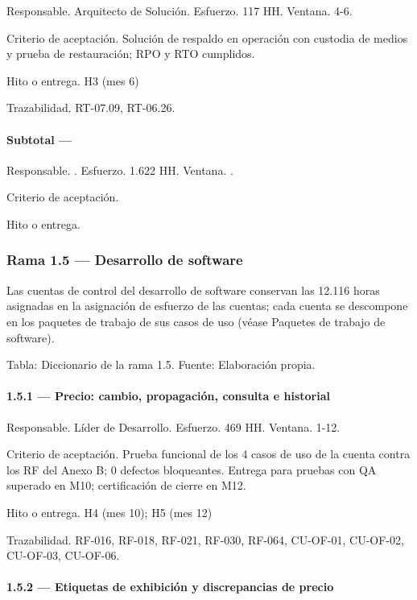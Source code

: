 \documentclass[11pt]{article}
\begin{document}
Responsable. Arquitecto de Solución. Esfuerzo. 117 HH. Ventana. 4-6.

Criterio de aceptación. Solución de respaldo en operación con custodia de medios y prueba de restauración; RPO y RTO cumplidos.

Hito o entrega. H3 (mes 6)

Trazabilidad. RT-07.09, RT-06.26.

\paragraph{Subtotal — }

Responsable. . Esfuerzo. 1.622 HH. Ventana. .

Criterio de aceptación.

Hito o entrega.

\subsubsection{Rama 1.5 — Desarrollo de software}

Las cuentas de control del desarrollo de software conservan las 12.116 horas asignadas en la asignación de esfuerzo de las cuentas; cada cuenta se descompone en los paquetes de trabajo de sus casos de uso (véase Paquetes de trabajo de software).

Tabla: Diccionario de la rama 1.5. Fuente: Elaboración propia.

\paragraph{1.5.1 — Precio: cambio, propagación, consulta e historial}

Responsable. Líder de Desarrollo. Esfuerzo. 469 HH. Ventana. 1-12.

Criterio de aceptación. Prueba funcional de los 4 casos de uso de la cuenta contra los RF del Anexo B; 0 defectos bloqueantes. Entrega para pruebas con QA superado en M10; certificación de cierre en M12.

Hito o entrega. H4 (mes 10); H5 (mes 12)

Trazabilidad. RF-016, RF-018, RF-021, RF-030, RF-064, CU-OF-01, CU-OF-02, CU-OF-03, CU-OF-06.

\paragraph{1.5.2 — Etiquetas de exhibición y discrepancias de precio}
\end{document}
